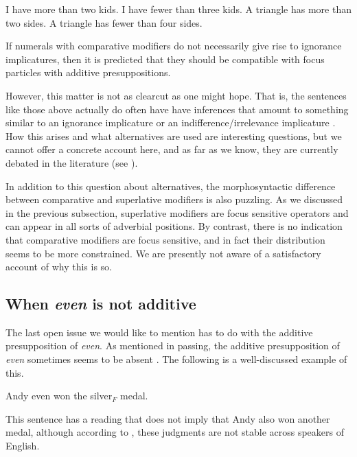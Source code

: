 \documentclass[output=paper]{langscibook}
\begin{document}
\ea
  \ea I have more than two kids.
  \ex I have fewer than three kids.
  \z
\ex
  \ea A triangle has more than two sides.
  \ex A triangle has fewer than four sides.
  \z
\z

\noindent If numerals with comparative modifiers do not necessarily give rise to ignorance implicatures, then it is predicted that they should be compatible with focus particles with additive presuppositions.

However, this matter is not as clearcut as one might hope. That is, the sentences like those above actually do often have have inferences that amount to something similar to an ignorance implicature or an indifference/irrelevance implicature \citep{meyer, lauer}. How this arises and what alternatives are used are interesting questions, but we cannot offer a concrete account here, and as far as we know, they are currently debated in the literature (see \citealt{foxhackl, mayr, schwarz}).

In addition to this question about alternatives, the morphosyntactic difference between comparative and superlative modifiers is also puzzling. As we discussed in the previous subsection, superlative modifiers are focus sensitive operators and can appear in all sorts of adverbial positions. By contrast, there is no indication that comparative modifiers are focus sensitive, and in fact their distribution seems to be more constrained. We are presently not aware of a satisfactory account of why this is so.


\subsection{When \textit{even} is not additive}

The last open issue we would like to mention has to do with the additive presupposition of \textit{even}. As mentioned in passing, the additive presupposition of \textit{even} sometimes seems to be absent \citep{rullmann, crnic}. The following is a well-discussed example of this.

\ea Andy even won the silver$_F$ medal.\label{don-sud:silver}\z

\begin{sloppypar}
\noindent This sentence has a reading that does not imply that Andy also won another medal, although according to \citet{francis}, these judgments are not stable across speakers of English.
\end{sloppypar}
\end{document}
